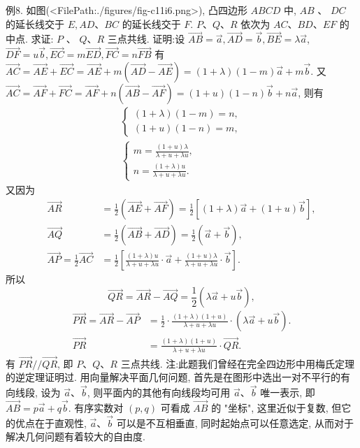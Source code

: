 例8. 如图(<FilePath:./figures/fig-c11i6.png>), 凸四边形 $A B C D$ 中, $A B$ 、 $D C$ 的延长线交于 $E, A D 、 B C$ 的延长线交于 $F$. $P 、 Q 、 R$ 依次为 $A C 、 B D 、 E F$ 的中点.
求证: $P$ 、 $Q 、 R$ 三点共线.
证明:设 $\overrightarrow{A B}=\vec{a}, \overrightarrow{A D}=\vec{b}, \overrightarrow{B E}=\lambda \vec{a}$, $\overrightarrow{D F}=u \vec{b}, \overrightarrow{E C}=m \overrightarrow{E D}, \overrightarrow{F C}=n \overrightarrow{F B}$
有 $\overrightarrow{A C}=\overrightarrow{A E}+\overrightarrow{E C}=\overrightarrow{A E}+m(\overrightarrow{A D}-\overrightarrow{A E})=(1+\lambda)(1-m) \vec{a}+m \vec{b}$.
又 $\overrightarrow{A C}=\overrightarrow{A F}+\overrightarrow{F C}=\overrightarrow{A F}+n(\overrightarrow{A B}-\overrightarrow{A F})=(1+u)(1-n) \vec{b}+n \vec{a}$, 则有
$$
\begin{gathered}
\left\{\begin{array}{l}
(1+\lambda)(1-m)=n, \\
(1+u)(1-n)=m,
\end{array}\right. \\
\left\{\begin{array}{l}
m=\frac{(1+u) \lambda}{\lambda+u+\lambda u}, \\
n=\frac{(1+\lambda) u}{\lambda+u+\lambda u} .
\end{array}\right.
\end{gathered}
$$
又因为
$$
\begin{aligned}
\overrightarrow{A R} & =\frac{1}{2}(\overrightarrow{A E}+\overrightarrow{A F})=\frac{1}{2}[(1+\lambda) \vec{a}+(1+u) \vec{b}], \\
\overrightarrow{A Q} & =\frac{1}{2}(\overrightarrow{A B}+\overrightarrow{A D})=\frac{1}{2}(\vec{a}+\vec{b}), \\
\overrightarrow{A P}=\frac{1}{2} \overrightarrow{A C} & =\frac{1}{2}\left[\frac{(1+\lambda) u}{\lambda+u+\lambda u} \cdot \vec{a}+\frac{(1+u) \lambda}{\lambda+u+\lambda u} \cdot \vec{b}\right] .
\end{aligned}
$$
所以
$$
\overrightarrow{Q R}=\overrightarrow{A R}-\overrightarrow{A Q}=\frac{1}{2}(\lambda \vec{a}+u \vec{b}),
$$
$$
\begin{aligned}
\overrightarrow{P R}=\overrightarrow{A R}-\overrightarrow{A P} & =\frac{1}{2} \cdot \frac{(1+\lambda)(1+u)}{\lambda+u+\lambda u} \cdot(\lambda \vec{a}+u \vec{b}) . \\
\overrightarrow{P R} & =\frac{(1+\lambda)(1+u)}{\lambda+u+\lambda u} \cdot \overrightarrow{Q R} .
\end{aligned}
$$
有 $\overrightarrow{P R} / / \overrightarrow{Q R}$, 即 $P 、 Q 、 R$ 三点共线.
注:此题我们曾经在完全四边形中用梅氏定理的逆定理证明过.
用向量解决平面几何问题, 首先是在图形中选出一对不平行的有向线段, 设为 $\vec{a} 、 \vec{b}$, 则平面内的其他有向线段均可用 $\vec{a} 、 \vec{b}$ 唯一表示, 即 $\overrightarrow{A B}=p \vec{a}+ q \vec{b}$. 有序实数对 $(p, q)$ 可看成 $\overrightarrow{A B}$ 的 "坐标", 这里近似于复数, 但它的优点在于直观性, $\vec{a} 、 \vec{b}$ 可以是不互相垂直, 同时起始点可以任意选定, 从而对于解决几何问题有着较大的自由度.



